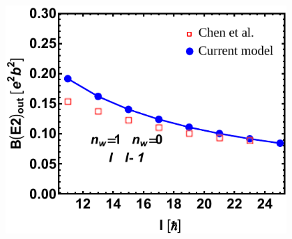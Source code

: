 \documentclass{beamer}
\begin{document}
\begin{frame}
\begin{columns}
\begin{column}{0.3\textwidth}
\begin{table}
{\begin{tabular}{|c|ccc|}
    \end{tabular}%
    }
  \end{table}
\end{column}
\begin{column}{0.7\textwidth}
  \begin{figure}
    \centering
    \includegraphics[scale=0.5]{Figs/ba130-EM.pdf}
  \end{figure}
  \end{column}
\end{columns}
\end{frame}
\end{document}

